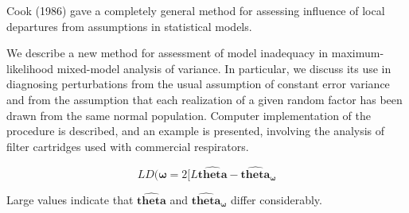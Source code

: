 






Cook (1986) gave a completely general method for assessing influence of local departures from
assumptions in statistical models.


We describe a new method for assessment of model inadequacy in maximum-likelihood mixed-model analysis of variance. In particular, we discuss its use in diagnosing perturbations from the usual assumption of constant error variance and from the assumption that each realization of a given random factor has been drawn from the same normal population. Computer implementation of the procedure is described, and an example is presented, involving the analysis of filter cartridges used with commercial respirators.

\newpage
\[  LD(\boldsymbol{\omega}= 2[ L\boldsymbol{\hat{theta}} - \boldsymbol{\hat{theta}_\omega} \]

Large values indicate that $\boldsymbol{\hat{theta}}$ and $\boldsymbol{\hat{theta}_\omega}$ differ considerably.
  
